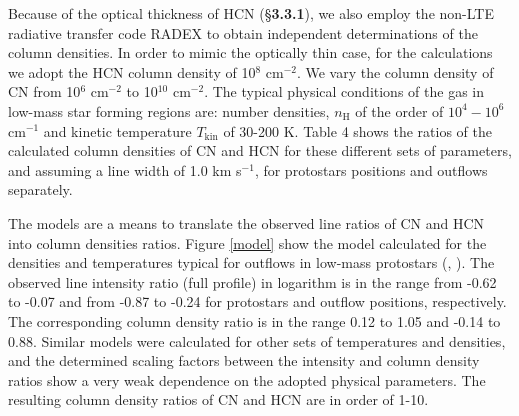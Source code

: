 \documentclass{aa}
\begin{document}
Because of the optical thickness of HCN (\S \textbf{3.3.1}), we also employ the non-LTE radiative transfer code RADEX 
to obtain independent determinations of the column densities. In order to mimic the optically thin case,
for the calculations we adopt the HCN column density of 10$^8$ cm$^{-2}$. We vary the column density 
of CN from 10$^6$ cm$^{-2}$ to 10$^{10}$ cm$^{-2}$. The typical physical conditions of the gas 
in low-mass star forming regions are: number densities, $n_\mathrm{H}$ of the order of \textbf{$10^{4}-10^{6}$} cm$^{-1}$ 
and kinetic temperature $T_\mathrm{kin}$ of 30-200 K. Table 4 shows the ratios of the calculated 
column densities of CN and HCN for these different sets of parameters, and assuming a line width of 1.0 km s$^{-1}$, for protostars positions and outflows separately.

The models are a means to translate the observed line ratios of CN and HCN into column densities ratios. 
Figure \ref{model} show the model calculated for the densities and temperatures typical for 
outflows in low-mass protostars (\citealt{vK09}, \citealt{Yil15}). The observed line intensity ratio (full profile) 
in logarithm is in the range from -0.62 to -0.07 and from -0.87 to -0.24 for protostars and outflow positions, respectively. The corresponding column density ratio is
in the range 0.12 to 1.05 and -0.14 to 0.88. Similar models were calculated for other sets of 
temperatures and densities, and the determined scaling factors between the intensity and column
density ratios show a very weak dependence on the adopted physical parameters. The resulting 
column density ratios of CN and HCN are in order of 1-10. 

\end{document}
